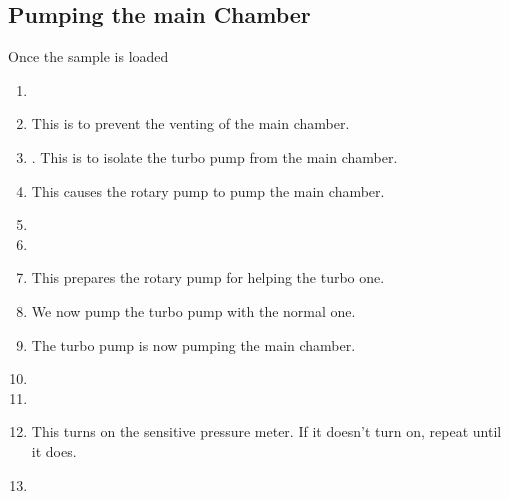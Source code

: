  \subsection{Pumping the main Chamber}
  Once the sample is loaded
  \begin{enumerate}
  	\item {}
  	\item {} This is to prevent the venting of the main chamber.
  	\item {}. This is to isolate the turbo pump from the main chamber.
  	\item {} This causes the rotary pump to pump the main chamber.
  	\item {}
  	\item {}
  	\item {} This prepares the rotary pump for helping the turbo one.
  	\item {} We now pump the turbo pump with the normal one.
  	\item {} The turbo pump is now pumping the main chamber.
  	\item {}
  	\item {}
  	\item {} This turns on the sensitive pressure meter. If it doesn't turn on, repeat until it does.
  	\item {}
  \end{enumerate}


